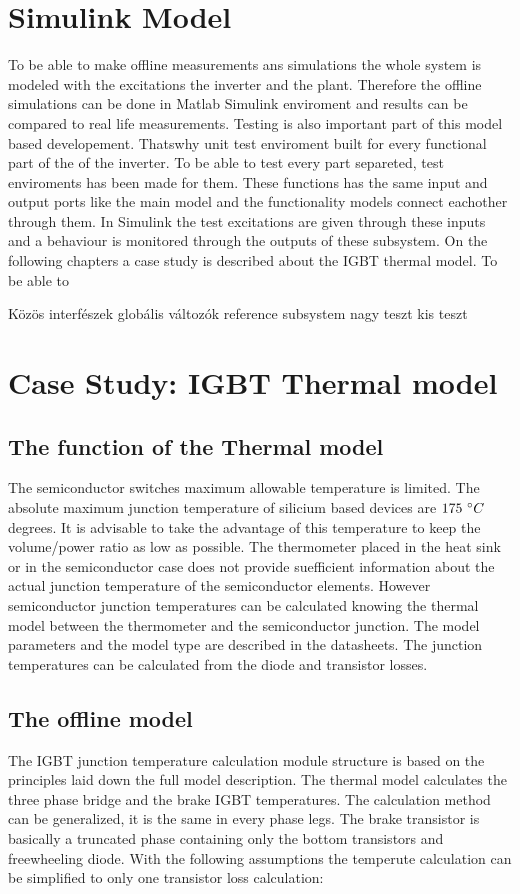 \section{Simulink Model}
To be able to make offline measurements ans simulations the whole system is modeled with the excitations the inverter and the plant. Therefore the offline simulations can be done in Matlab Simulink enviroment and results can be compared to real life measurements. Testing is also important part of this model based developement. Thatswhy unit test enviroment built for every functional part of the of the inverter. To be able to test every part separeted, test enviroments has been made for them. These functions has the same input and output ports like the main model and the functionality models connect eachother through them. In Simulink the test excitations are given through these inputs and a behaviour is monitored through the outputs of these subsystem.  On the following chapters a case study is described about the IGBT thermal model.
To be able to 

Közös interfészek
globális változók
reference subsystem
nagy teszt kis teszt

\section{Case Study: IGBT Thermal model}

\subsection{The function of the Thermal model}
The semiconductor switches maximum allowable temperature is limited. The absolute maximum junction temperature of silicium based devices  are $175\ \degree{}C$ degrees. It is advisable to take the advantage of this temperature to keep the volume/power ratio as low as possible. The thermometer placed in the heat sink or in the semiconductor case does not provide suefficient information about the actual junction temperature of the semiconductor elements. However semiconductor junction temperatures can be calculated knowing the thermal model between the thermometer and the semiconductor junction. The model parameters and the model type are described in the datasheets. The junction temperatures can be calculated from the diode and transistor losses.

\subsection{The offline model}
The IGBT junction temperature calculation module structure is based on the principles laid down the full model description. The thermal model calculates the three phase bridge and the brake IGBT temperatures. The calculation method can be generalized, it is the same in every phase legs. The brake transistor is basically a truncated phase containing only the bottom transistors and freewheeling diode. With the following assumptions the temperute calculation can be simplified to only one transistor loss calculation:


